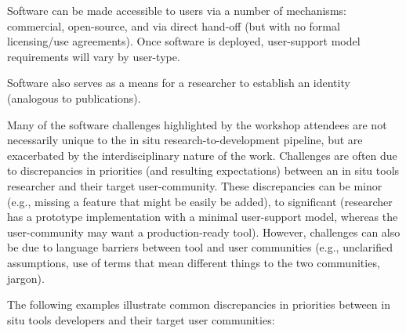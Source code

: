 Software can be made accessible to users via a number of mechanisms: commercial, open-source, and via direct hand-off (but with no formal licensing/use agreements). Once software is deployed, user-support model requirements will vary by user-type. 

Software also serves as a means for a researcher to establish an identity (analogous to publications).

 Many of the software challenges highlighted by the workshop attendees are not necessarily unique to the in situ research-to-development pipeline, but are exacerbated by the interdisciplinary nature of the work.  Challenges are often due to discrepancies in priorities (and resulting expectations) between an in situ tools researcher and their target user-community. These discrepancies can be minor (e.g., missing a feature that might be easily be added), to significant (researcher has a prototype implementation with a minimal user-support model, whereas the user-community may want a production-ready tool). However, challenges can also be due to language barriers between tool and user communities (e.g., unclarified assumptions, use of terms that mean different things to the two communities, jargon).   

The following examples illustrate common discrepancies in priorities between in situ tools developers and their target user communities:

